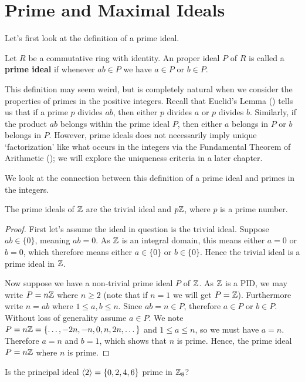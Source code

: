\section{Prime and Maximal Ideals}
Let's first look at the definition of a prime ideal.
\begin{definition}
    Let $R$ be a commutative ring with identity. An proper ideal $P$ of $R$ is called a \textbf{prime ideal} if whenever $ab \in P$ we have $a \in P$ or $b \in P$.
\end{definition}
This definition may seem weird, but is completely natural when we consider the properties of primes in the positive integers. Recall that Euclid's Lemma () tells us that if a prime $p$ divides $ab$, then either $p$ divides $a$ or $p$ divides $b$. Similarly, if the product $ab$ belongs within the prime ideal $P$, then either $a$ belongs in $P$ or $b$ belongs in $P$. However, prime ideals does not necessarily imply unique `factorization' like what occurs in the integers via the Fundamental Theorem of Arithmetic (); we will explore the uniqueness criteria in a later chapter.

We look at the connection between this definition of a prime ideal and primes in the integers.
\begin{proposition}\label{prop-ideals-of-Z}
    The prime ideals of $\mathbb{Z}$ are the trivial ideal and $p\mathbb{Z}$, where $p$ is a prime number.
\end{proposition}
\begin{proof}
    First let's assume the ideal in question is the trivial ideal. Suppose $ab \in \{0\}$, meaning $ab = 0$. As $\mathbb{Z}$ is an integral domain, this means either $a = 0$ or $b = 0$, which therefore means either $a \in \{0\}$ or $b \in \{0\}$. Hence the trivial ideal is a prime ideal in $\mathbb{Z}$.

    Now suppose we have a non-trivial prime ideal $P$ of $\mathbb{Z}$. As $\mathbb{Z}$ is a PID, we may write $P = n\mathbb{Z}$ where $n \geq 2$ (note that if $n = 1$ we will get $P = \mathbb{Z}$). Furthermore write $n = ab$ where $1 \leq a,b \leq n$. Since $ab = n \in P$, therefore $a \in P$ or $b \in P$. Without loss of generality assume $a \in P$. We note $P = n\mathbb{Z} = \{\dots, -2n, -n, 0, n, 2n, \dots\}$ and $1 \leq a \leq n$, so we must have $a = n$. Therefore $a = n$ and $b = 1$, which shows that $n$ is prime. Hence, the prime ideal $P = n\mathbb{Z}$ where $n$ is prime.
\end{proof}
\begin{exercise}
    Is the principal ideal $\left\langle2\right\rangle = \{0, 2, 4, 6\}$ prime in $\mathbb{Z}_8$?
\end{exercise}

